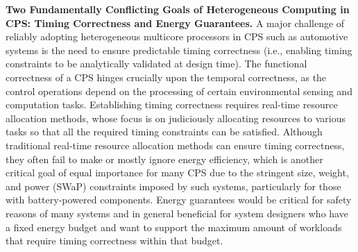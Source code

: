 
\vspace{2mm} \noindent \textbf{Two Fundamentally Conflicting Goals of Heterogeneous Computing in CPS: Timing Correctness and Energy Guarantees.} 
A major challenge of reliably adopting heterogeneous multicore processors in CPS such as automotive systems is the need to ensure predictable timing correctness (i.e., enabling timing constraints to be analytically validated at design time).  %
The functional correctness of a CPS hinges crucially upon the temporal correctness, as the control operations depend on the processing of certain environmental sensing and computation tasks. Establishing timing correctness requires real-time resource allocation methods, whose focus is on judiciously allocating resources to various tasks so that all the required timing constraints can be satisfied. Although traditional real-time resource allocation methods can ensure timing correctness, they often fail to make or mostly ignore energy efficiency, which is another critical goal of equal importance for many CPS due to the stringent  size, weight, and power (SWaP) constraints imposed by such systems, particularly for those with battery-powered components. Energy guarantees would be critical for safety reasons of many systems and in general beneficial for system designers who have a fixed energy budget and want to support the maximum amount of workloads that require timing correctness within that budget. 

